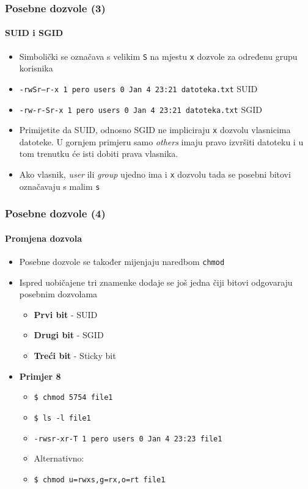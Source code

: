\documentclass[table,usenames,dvipsnames]{beamer}
\newcommand{\shell}[1]{\texttt{#1}}
\begin{document}
\begin{frame}[t]
	\frametitle{Posebne dozvole (3)}
	\framesubtitle{SUID i SGID}
\begin{itemize}
	\item Simbolički se označava s velikim \shell{S} na mjestu \shell{x} dozvole za određenu grupu korisnika
	\item[] {\footnotesize \shell{-rwSr--r-x 1 pero users 0 Jan  4 23:21 datoteka.txt} \hfill SUID }
	\item[] {\footnotesize \shell{-rw-r-Sr-x 1 pero users 0 Jan  4 23:21 datoteka.txt} \hfill SGID }
\end{itemize}
\begin{itemize}
	\item Primijetite da SUID, odnosno SGID ne impliciraju \shell{x} dozvolu vlasnicima datoteke. U gornjem primjeru samo \textit{others} imaju pravo izvršiti datoteku i u tom trenutku će isti dobiti prava vlasnika.
	\item Ako vlasnik, \textit{user} ili \textit{group} ujedno ima i \shell{x} dozvolu tada se posebni bitovi označavaju s malim \shell{s}
\end{itemize}
\end{frame}

\begin{frame}
	\frametitle{Posebne dozvole (4)}
	\framesubtitle{Promjena dozvola}
\begin{itemize}
	\item Posebne dozvole se također mijenjaju naredbom \shell{chmod}
	\item Ispred uobičajene tri znamenke dodaje se još jedna čiji bitovi odgovaraju posebnim dozvolama
	\begin{itemize}
		\item \textbf{Prvi bit} - SUID
		\item \textbf{Drugi bit} - SGID
		\item \textbf{Treći bit} - Sticky bit
	\end{itemize}
\end{itemize}
\begin{itemize}
	\item \textbf{Primjer 8}
	\begin{itemize}
		\item[] \shell{\$ chmod 5754 file1}
		\item[] \shell{\$ ls -l file1}
		\item[] \shell{-rwsr-xr-T 1 pero users 0 Jan  4 23:23 file1}
		\item \vspace{1em} Alternativno:
		\item[] \shell{\$ chmod u=rwxs,g=rx,o=rt file1}
	\end{itemize}
\end{itemize}
\end{frame}
\end{document}
